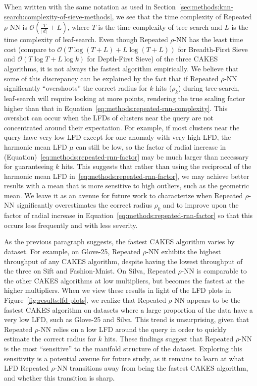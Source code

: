 When written with the same notation as used in Section~\ref{sec:methods:knn-search:complexity-of-sieve-methods}, we see that the time complexity of Repeated $\rho$-NN is $\mathcal{O}(\tfrac{T}{\lceil d \rceil} + L)$, where $T$ is the time complexity of tree-search and $L$ is the time complexity of leaf-search.
Even though Repeated $\rho$-NN has the least time cost (compare to $\mathcal{O}(T\log{(T+L)} + L\log{(T+L)})$ for Breadth-First Sieve and $\mathcal{O}(T\log{T} + L\log{k})$ for Depth-First Sieve) of the three CAKES algorithms, it is not always the fastest algorithm empirically.
We believe that some of this discrepancy can be explained by the fact that if Repeated $\rho$-NN significantly ``overshoots'' the correct radius for $k$ hits ($\rho_k$) during tree-search, leaf-search will require looking at more points, rendering the true scaling factor higher than that in Equation~\ref{eq:methods:repeated-rnn-complexity}.
This overshot can occur when the LFDs of clusters near the query are not concentrated around their expectation.
For example, if most clusters near the query have very low LFD except for one anomaly with very high LFD,
the harmonic mean LFD $\mu$ can still be low, so the factor of radial increase in (Equation)~\ref{eq:methods:repeated-rnn-factor} may be much larger than necessary for guaranteeing $k$ hits.
This suggests that rather than using the reciprocal of the harmonic mean LFD in~\ref{eq:methods:repeated-rnn-factor}, we may achieve better results with a mean that is more sensitive to high outliers, such as the geometric mean.
We leave it as an avenue for future work to characterize when Repeated $\rho$-NN significantly overestimates the correct radius $\rho_k$ and to improve upon the factor of radial increase in Equation~\ref{eq:methods:repeated-rnn-factor} so that this occurs less frequently and with less severity.

As the previous paragraph suggests, the fastest CAKES algorithm varies by dataset.
For example, on Glove-25, Repeated $\rho$-NN exhibits the highest throughput of any CAKES algorithm, despite having the lowest throughput of the three on Sift and Fashion-Mnist.
On Silva, Repeated $\rho$-NN is comparable to the other CAKES algorithms at low multipliers, but becomes the fastest at the higher multipliers.
When we view these results in light of the LFD plots in Figure~\ref{fig:results:lfd-plots}, we realize that Repeated $\rho$-NN appears to be the fastest CAKES algorithm on datasets where a large proportion of the data have a very low LFD, such as Glove-25 and Silva.
This trend is unsurprising, given that Repeated $\rho$-NN relies on a low LFD around the query in order to quickly estimate the correct radius for $k$ hits.
These findings suggest that Repeated $\rho$-NN is the most ``sensitive'' to the manifold structure of the dataset.
Exploring this sensitivity is a potential avenue for future study, as it remains to learn at what LFD Repeated $\rho$-NN transitions away from being the fastest CAKES algorithm, and whether this transition is sharp.

